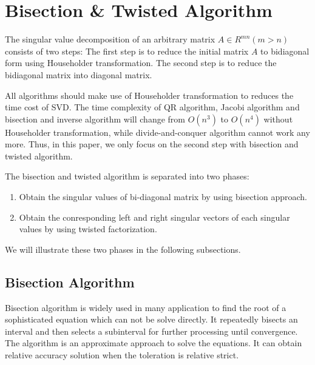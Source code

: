 \section{Bisection \& Twisted Algorithm}
The singular value decomposition of an arbitrary matrix $A\in R^{mn} (m>n)$ consists of two steps:
The first step is to reduce the initial matrix $A$ to bidiagonal form using Householder transformation.
The second step is to reduce the bidiagonal matrix into diagonal matrix.

All algorithms should make use of Householder transformation to reduces the time cost of SVD.
The time complexity of QR algorithm, Jacobi algorithm and bisection and inverse algorithm will change from $O(n^3)$ to $O(n^4)$ without Householder transformation, while divide-and-conquer algorithm cannot work any more.
Thus, in this paper, we only focus on the second step with bisection and twisted algorithm.

The bisection and twisted algorithm is separated into two phases:
\begin{enumerate}
\item Obtain the singular values of bi-diagonal matrix by using bisection approach.
\item Obtain the conresponding left and right singular vectors of each singular values by using twisted factorization.
\end{enumerate}
We will illustrate these two phases in the following subsections.

\subsection{Bisection Algorithm}
Bisection algorithm is widely used in many application to find the root of a sophisticated equation which can not be solve directly.
It repeatedly bisects an interval and then selects a subinterval for further processing until convergence.
The algorithm is an approximate approach to solve the equations.
It can obtain relative accuracy solution when the toleration is relative strict.


